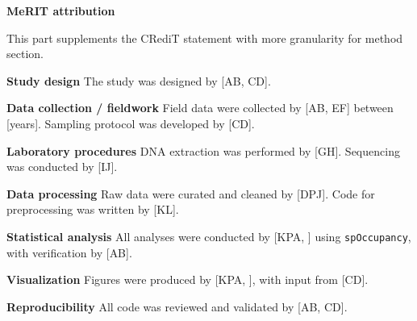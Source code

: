 \documentclass[
  letterpaper,
  DIV=11,
  numbers=noendperiod]{scrartcl}
\begin{document}
\textbf{MeRIT attribution}

This part supplements the CRediT statement with more granularity for
method section.

\textbf{Study design} The study was designed by {[}AB, CD{]}.

\textbf{Data collection / fieldwork} Field data were collected by {[}AB,
EF{]} between {[}years{]}. Sampling protocol was developed by {[}CD{]}.

\textbf{Laboratory procedures} DNA extraction was performed by {[}GH{]}.
Sequencing was conducted by {[}IJ{]}.

\textbf{Data processing} Raw data were curated and cleaned by {[}DPJ{]}.
Code for preprocessing was written by {[}KL{]}.

\textbf{Statistical analysis} All analyses were conducted by {[}KPA, {]}
using \texttt{spOccupancy}, with verification by {[}AB{]}.

\textbf{Visualization} Figures were produced by {[}KPA, {]}, with input
from {[}CD{]}.

\textbf{Reproducibility} All code was reviewed and validated by {[}AB,
CD{]}.
\end{document}

